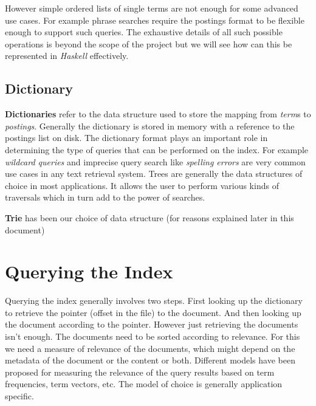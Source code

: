 However simple ordered lists of single terms are not enough for some advanced use cases.
For example phrase searches require the postings format to be flexible enough to support such queries.
The exhaustive details of all such possible operations is beyond the scope of the project but we will see how can this be represented
in \textit{Haskell} effectively.


\subsection{Dictionary}
\textbf{Dictionaries} refer to the data structure used to store the mapping from \textit{term}s to \textit{postings}.
Generally the dictionary is stored in memory with a reference to the postings list on disk.
The dictionary format plays an important role in determining the type of queries that can be performed on the index.
For example \textit{wildcard queries} and imprecise query search like \textit{spelling errors} are very common use cases in any text retrieval system.
Trees are generally the data structures of choice in most applications.
It allows the user to perform various kinds of traversals which in turn add to the power of searches.

\textbf{Trie} has been our choice of data structure (for reasons explained later in this document)


\section{Querying the Index}
Querying the index generally involves two steps.
First looking up the dictionary to retrieve the pointer (offset in the file) to the document.
And then looking up the document according to the pointer.
However just retrieving the documents isn't enough. The documents need to be sorted according to relevance.
For this we need a measure of relevance of the documents, which might depend on the metadata of the document or the content or both.
Different models have been proposed for measuring the relevance of the query results based on term frequencies, term vectors, etc.
The model of choice is generally application specific.

